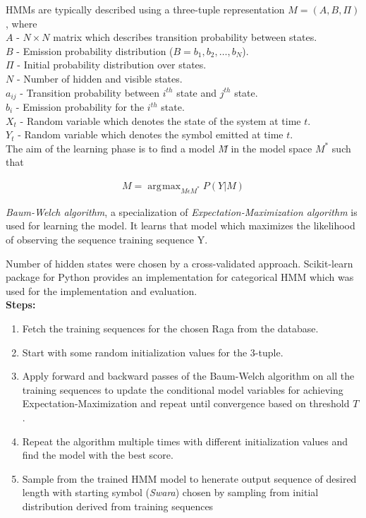 \documentclass[journal]{IEEEtran}
\DeclareMathOperator*{\argmax}{\arg\!\max}
\begin{document}
HMMs are typically described using a three-tuple representation \cite{hill} $M = (A, B, \Pi)$, where\\
$A$ - $N \times N$ matrix which describes transition probability between states.\\
$B$ - Emission probability distribution ($B = {b_1, b_2, \hdots , b_N}$).\\
$Π$ - Initial probability distribution over states.\\
$N$ - Number of hidden and visible states.\\
$a_{ij}$ - Transition probability between $i^{th}$ state and $j^{th}$ state.\\
$b_i$ - Emission probability for the $i^{th}$ state.\\
$X_t$ - Random variable which denotes the state of the system at time $t$.\\
$Y_t$ - Random variable which denotes the symbol emitted at time $t$.\\

The aim of the learning phase is to find a model $M$̂ in the model space $M^*$ such that

\begin{align*}
    M = \argmax_{M \epsilon M^*} P(Y|M) 
\end{align*}

\emph{Baum-Welch algorithm}, a specialization of \emph{Expectation-Maximization algorithm} is used for learning the model. It learns that model which maximizes the likelihood of observing the sequence training sequence Y.

Number of hidden states were chosen by a cross-validated approach. Scikit-learn package for Python provides an implementation for categorical HMM \cite{scikit}\cite{scipy} which was used for the implementation and evaluation.\\

\textbf{Steps:}
\begin{enumerate}
\item Fetch the training sequences for the chosen Raga from the database.
\item Start with some random initialization values for the 3-tuple.
\item Apply forward and backward passes of the Baum-Welch algorithm on all the training sequences to update the conditional model variables for achieving Expectation-Maximization and repeat until convergence based on threshold $T$.
\item Repeat the algorithm multiple times with different initialization values and find the model with the best score.
\item Sample from the trained HMM model to henerate output sequence of desired length with starting symbol (\emph{Swara}) chosen by sampling from initial distribution derived from training sequences\\
\end{enumerate}
\end{document}
